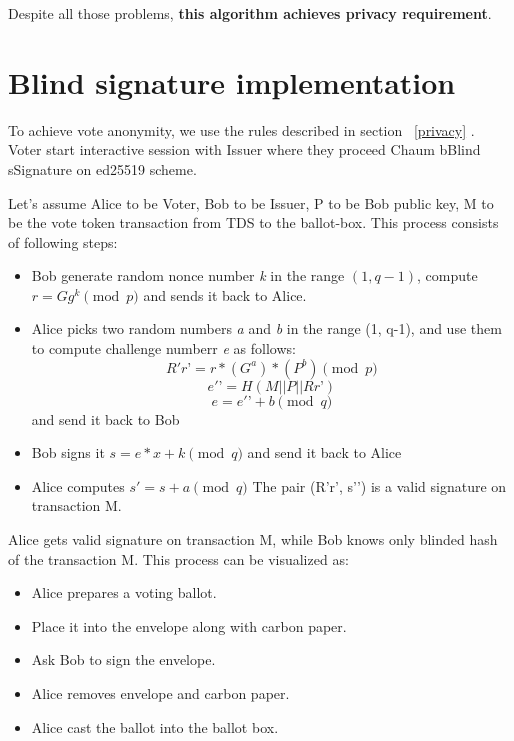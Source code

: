 \documentclass[runningheads]{llncs}
\begin{document}
Despite all those problems, \textbf{this algorithm achieves privacy requirement}.




\section{Blind signature implementation}

To achieve vote anonymity, we use the rules described in section ~\ref{privacy} . Voter start interactive session with Issuer where they proceed Chaum bBlind sSignature \cite{blindsignatureschaum} on ed25519 scheme. 

Let's assume Alice to be Voter, Bob to be Issuer, P to be Bob public key, M to be the vote token transaction from TDS to the ballot-box.
This process consists of following steps:
\begin{itemize}
\item Bob generate random nonce number \textit{k} in the range $(1, q-1)$, compute 
\(r = Gg^k \pmod{p}\)
and sends it back to Alice.
\item Alice picks two random numbers \textit{a} and \textit{b} in the range (1, q-1), and use them to compute challenge numberr \textit{e} as follows:
\[R'r’ = r*(G^a)*(P^b) \pmod{p}\]
\[e'’ = H(M || P || Rr’)\]
\[e = e'’ + b \pmod{q}\]
and send it back to Bob
\item Bob signs it 
\(s = e*x + k \pmod{q}\)
and send it back to Alice
\item Alice computes 
$s' = s + a \pmod{q}$
The pair (R'r’, s'’) is a valid signature on transaction M.
\end{itemize}
Alice gets valid signature on transaction M, while Bob knows only blinded hash of the transaction M.
This process can be visualized as:
\begin{itemize}
    \item Alice prepares a voting ballot.
    \item Place it into the envelope along with carbon paper.
    \item Ask Bob to sign the envelope.
    \item Alice removes envelope and carbon paper.
    \item Alice cast the ballot into the ballot box.
\end{itemize}
\end{document}
